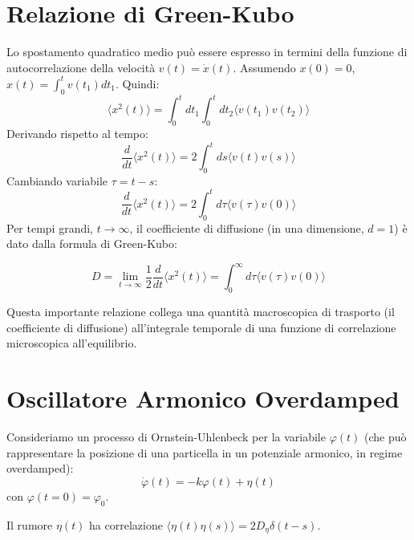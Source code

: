 \section{Relazione di Green-Kubo}
Lo spostamento quadratico medio può essere espresso in termini della funzione di autocorrelazione della velocità $v(t) = \dot{x}(t)$. Assumendo $x(0)=0$, $x(t) = \int_0^t v(t_1) dt_1$.
Quindi:
\begin{equation}
\langle x^{2}(t)\rangle=\int_{0}^{t}dt_{1}\int_{0}^{t}dt_{2}\langle v(t_{1})v(t_{2})\rangle
\end{equation}
Derivando rispetto al tempo:
\begin{equation}
\frac{d}{dt}\langle x^{2}(t)\rangle = 2\int_{0}^{t}ds\langle v(t)v(s)\rangle
\end{equation}
Cambiando variabile $\tau = t-s$:
\begin{equation}
\frac{d}{dt}\langle x^{2}(t)\rangle = 2\int_{0}^{t}d\tau \langle v(\tau)v(0)\rangle
\end{equation}
Per tempi grandi, $t \rightarrow \infty$, il coefficiente di diffusione (in una dimensione, $d=1$) è dato dalla formula di Green-Kubo:

\begin{tcolorbox}[colback=colorA!5, colframe=colorA, arc=3mm, boxrule=1.2pt]
\begin{equation}
D= \lim_{t\rightarrow\infty} \frac{1}{2}\frac{d}{dt}\langle x^{2}(t)\rangle = \int_{0}^{\infty}d\tau\langle v(\tau)v(0)\rangle
\end{equation}
\end{tcolorbox}

Questa importante relazione collega una quantità macroscopica di trasporto (il coefficiente di diffusione) all'integrale temporale di una funzione di correlazione microscopica all'equilibrio.

\section{Oscillatore Armonico Overdamped}
Consideriamo un processo di Ornstein-Uhlenbeck per la variabile $\varphi(t)$ (che può rappresentare la posizione di una particella in un potenziale armonico, in regime overdamped):
\begin{equation}
\dot{\varphi}(t)=-k\varphi(t)+\eta(t)
\end{equation}
con $\varphi(t=0)=\varphi_0$.

Il rumore $\eta(t)$ ha correlazione $\langle\eta(t)\eta(s)\rangle=2D_{\eta}\delta(t-s)$.



